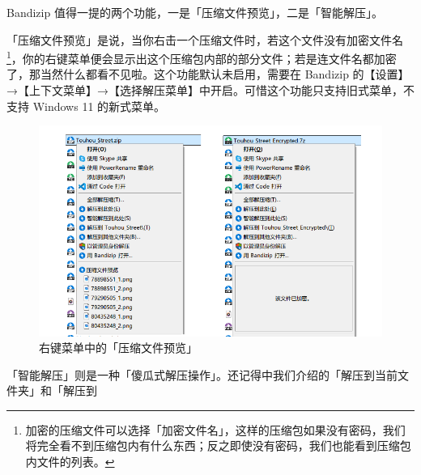 {Bandizip 值得一提的两个功能，一是「压缩文件预览」，二是「智能解压」。

「压缩文件预览」是说，当你右击一个压缩文件时，若这个文件没有加密文件名\footnote{加密的压缩文件可以选择「加密文件名」，这样的压缩包如果没有密码，我们将完全看不到压缩包内有什么东西；反之即使没有密码，我们也能看到压缩包内文件的列表。}，你的右键菜单便会显示出这个压缩包内部的部分文件；若是连文件名都加密了，那当然什么都看不见啦。这个功能默认未启用，需要在 Bandizip 的【设置】→【上下文菜单】→【选择解压菜单】中开启。可惜这个功能只支持旧式菜单，不支持 Windows 11 的新式菜单。

\begin{figure}[htb!]
  \centering
  \includegraphics[width=.7\textwidth]{assets/software/Compressed_Preview.png}
  \caption{右键菜单中的「压缩文件预览」}
  \label{fig:Compressed_Preview}
\end{figure}

「智能解压」则是一种「傻瓜式解压操作」。还记得中我们介绍的「解压到当前文件夹」和「解压到 }

